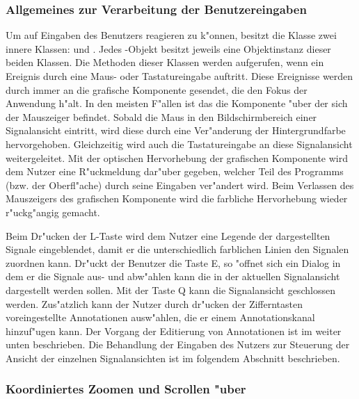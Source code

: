 \subsubsection{Allgemeines zur Verarbeitung der Benutzereingaben}

Um auf Eingaben des Benutzers reagieren zu k"onnen, besitzt die Klasse  zwei innere Klassen:  und .
Jedes -Objekt besitzt jeweils eine Objektinstanz dieser beiden Klassen.
Die Methoden dieser Klassen werden aufgerufen, wenn ein Ereignis durch eine Maus- oder Tastatureingabe auftritt.
Diese Ereignisse werden durch \java immer an die grafische Komponente gesendet, die den Fokus der Anwendung h"alt.
In den meisten F"allen ist das die Komponente "uber der sich der Mauszeiger befindet.
Sobald die Maus in den Bildschirmbereich einer Signalansicht eintritt, wird diese durch eine Ver"anderung der Hintergrundfarbe hervorgehoben.
Gleichzeitig wird auch die Tastatureingabe an diese Signalansicht weitergeleitet.
Mit der optischen Hervorhebung der grafischen Komponente wird dem Nutzer eine R"uckmeldung dar"uber gegeben, welcher Teil des Programms (bzw. der Oberfl"ache) durch seine Eingaben ver"andert wird.
Beim Verlassen des Mauszeigers des grafischen Komponente wird die farbliche Hervorhebung wieder r"uckg"angig gemacht.

Beim Dr"ucken der L-Taste wird dem Nutzer eine Legende der dargestellten Signale eingeblendet, damit er die unterschiedlich farblichen Linien den Signalen zuordnen kann.
Dr"uckt der Benutzer die Taste E, so "offnet sich ein Dialog in dem er die Signale aus- und abw"ahlen kann die in der aktuellen Signalansicht dargestellt werden sollen.
Mit der Taste Q kann die Signalansicht geschlossen werden.
Zus"atzlich kann der Nutzer durch dr"ucken der Zifferntasten voreingestellte Annotationen ausw"ahlen, die er einem Annotationskanal hinzuf"ugen kann.
Der Vorgang der Editierung von Annotationen ist im  weiter unten beschrieben.
Die Behandlung der Eingaben des Nutzers zur Steuerung der Ansicht der einzelnen Signalansichten ist im folgendem Abschnitt beschrieben.


\subsubsection{Koordiniertes Zoomen und Scrollen "uber }
\label{sec:signalpanel_koordination}

